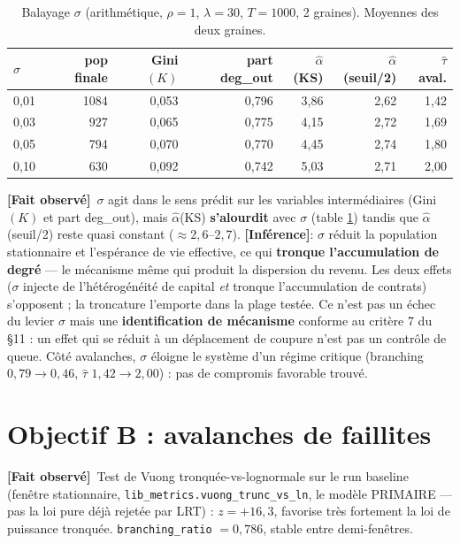 \documentclass[11pt,a4paper]{article}
\newcommand{\code}[1]{\texttt{#1}}
\newcommand{\fait}{\textbf{[Fait observé]}}
\newcommand{\inference}{\textbf{[Inférence]}}
\begin{document}
\begin{table}[h]
\centering
\caption{Balayage $\sigma$ (arithmétique, $\rho=1$, $\lambda=30$, $T=1000$,
2 graines). Moyennes des deux graines.}
\label{tab:sigma}
\begin{tabular}{lrrrrrr}
\toprule
$\sigma$ & pop finale & Gini$(K)$ & part deg\_out & $\hat\alpha$(KS) & $\hat\alpha$(seuil/2) & $\hat\tau$ aval. \\
\midrule
0,01 & 1084 & 0,053 & 0,796 & 3,86 & 2,62 & 1,42 \\
0,03 & 927  & 0,065 & 0,775 & 4,15 & 2,72 & 1,69 \\
0,05 & 794  & 0,070 & 0,770 & 4,45 & 2,74 & 1,80 \\
0,10 & 630  & 0,092 & 0,742 & 5,03 & 2,71 & 2,00 \\
\bottomrule
\end{tabular}
\end{table}

\fait\ $\sigma$ agit dans le sens prédit sur les variables intermédiaires
(Gini$(K)$ et part deg\_out), mais $\hat\alpha$(KS) \textbf{s'alourdit}
avec $\sigma$ (table \ref{tab:sigma}) tandis que $\hat\alpha$(seuil/2) reste
quasi constant ($\approx2{,}6$--$2{,}7$). \inference : $\sigma$ réduit la
population stationnaire et l'espérance de vie effective, ce qui
\textbf{tronque l'accumulation de degré} --- le mécanisme même qui produit
la dispersion du revenu. Les deux effets ($\sigma$ injecte de
l'hétérogénéité de capital \emph{et} tronque l'accumulation de contrats)
s'opposent ; la troncature l'emporte dans la plage testée. Ce n'est pas un
échec du levier $\sigma$ mais une \textbf{identification de mécanisme}
conforme au critère 7 du §11 : un effet qui se réduit à un déplacement de
coupure n'est pas un contrôle de queue. Côté avalanches, $\sigma$ éloigne
le système d'un régime critique (branching $0{,}79\to0{,}46$, $\hat\tau$
$1{,}42\to2{,}00$) : pas de compromis favorable trouvé.

\section{Objectif B : avalanches de faillites}

\fait\ Test de Vuong tronquée-vs-lognormale sur le run baseline (fenêtre
stationnaire, \code{lib\_metrics.vuong\_trunc\_vs\_ln}, le modèle PRIMAIRE
--- pas la loi pure déjà rejetée par LRT) : $z=+16{,}3$, favorise très
fortement la loi de puissance tronquée. \code{branching\_ratio}
$=0{,}786$, stable entre demi-fenêtres.
\end{document}
